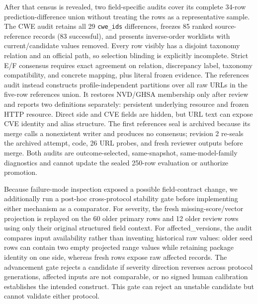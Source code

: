 After that census is revealed, two field-specific audits cover its complete 34-row prediction-difference union without treating the rows as a representative sample. The CWE audit retains all 29 \texttt{cwe\_ids} differences, freezes 85 ranked source-reference records (83 successful), and presents inverse-order worklists with current/candidate values removed. Every row visibly has a disjoint taxonomy relation and an official path, so selection blinding is explicitly incomplete. Strict E/F consensus requires exact agreement on relation, discrepancy label, taxonomy compatibility, and concrete mapping, plus literal frozen evidence. The references audit instead constructs profile-independent partitions over all raw URLs in the five-row references union. It restores NVD/GHSA membership only after review and reports two definitions separately: persistent underlying resource and frozen HTTP resource. Direct side and CVE fields are hidden, but URL text can expose CVE identity and alias structure. The first references seal is archived because its merge calls a nonexistent writer and produces no consensus; revision 2 re-seals the archived attempt, code, 26 URL probes, and fresh reviewer outputs before merge. Both audits are outcome-selected, same-snapshot, same-model-family diagnostics and cannot update the sealed 250-row evaluation or authorize promotion.

Because failure-mode inspection exposed a possible field-contract change, we additionally run a post-hoc cross-protocol stability gate before implementing either mechanism as a comparator. For severity, the fresh missing-score/vector projection is replayed on the 60 older primary rows and 12 older review rows using only their original structured field context. For affected\_versions, the audit compares input availability rather than inventing historical raw values: older seed rows can contain two empty projected range values while retaining package identity on one side, whereas fresh rows expose raw affected records. The advancement gate rejects a candidate if severity direction reverses across protocol generations, affected inputs are not comparable, or no signed human calibration establishes the intended construct. This gate can reject an unstable candidate but cannot validate either protocol.

